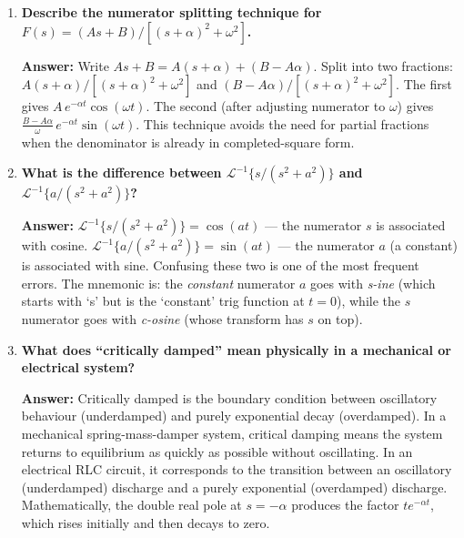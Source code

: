\documentclass[12pt,a4paper]{article}
\begin{document}
\begin{enumerate}[leftmargin=*, label=\textbf{Q\arabic*.}]
\textbf{Answer:}
\begin{itemize}[leftmargin=*]
  \item \textbf{Underdamped} ($\omega^2 = c - b^2/4 > 0$): denominator becomes
        $(s+\alpha)^2 + \omega^2$; inverse involves $e^{-\alpha t}\sin(\omega t)$ or
        $e^{-\alpha t}\cos(\omega t)$ --- oscillatory decaying response.
  \item \textbf{Critically damped} ($\omega^2 = 0$): denominator becomes $(s+\alpha)^2$;
        inverse involves $t\,e^{-\alpha t}$ --- monotone decay with initial linear rise.
  \item \textbf{Overdamped} ($\omega^2 < 0$): denominator factors into two distinct real
        linear factors; handled via partial fractions (Topic~03) --- monotone decaying
        response with no oscillation.
\end{itemize}

\item \textbf{Describe the numerator splitting technique for
      $F(s) = (As+B)/[(s+\alpha)^2 + \omega^2]$.}

\textbf{Answer:}
Write $As + B = A(s + \alpha) + (B - A\alpha)$.
Split into two fractions:
$A(s+\alpha)/[(s+\alpha)^2+\omega^2]$ and $(B-A\alpha)/[(s+\alpha)^2+\omega^2]$.
The first gives $A\,e^{-\alpha t}\cos(\omega t)$.
The second (after adjusting numerator to $\omega$) gives
$\frac{B-A\alpha}{\omega}\,e^{-\alpha t}\sin(\omega t)$.
This technique avoids the need for partial fractions when the denominator is already
in completed-square form.

\item \textbf{What is the difference between $\mathcal{L}^{-1}\{s/(s^2+a^2)\}$
      and $\mathcal{L}^{-1}\{a/(s^2+a^2)\}$?}

\textbf{Answer:}
$\mathcal{L}^{-1}\{s/(s^2+a^2)\} = \cos(at)$ --- the numerator $s$ is associated with cosine.
$\mathcal{L}^{-1}\{a/(s^2+a^2)\} = \sin(at)$ --- the numerator $a$ (a constant) is associated
with sine.
Confusing these two is one of the most frequent errors. The mnemonic is: the \emph{constant}
numerator $a$ goes with \emph{s-ine} (which starts with `s' but is the `constant' trig
function at $t=0$), while the $s$ numerator goes with \emph{c-osine} (whose transform
has $s$ on top).

\item \textbf{What does ``critically damped'' mean physically in a mechanical or
      electrical system?}

\textbf{Answer:}
Critically damped is the boundary condition between oscillatory behaviour (underdamped) and
purely exponential decay (overdamped). In a mechanical spring-mass-damper system, critical
damping means the system returns to equilibrium as quickly as possible without oscillating.
In an electrical RLC circuit, it corresponds to the transition between an oscillatory
(underdamped) discharge and a purely exponential (overdamped) discharge.
Mathematically, the double real pole at $s = -\alpha$ produces the factor $te^{-\alpha t}$,
which rises initially and then decays to zero.

\end{enumerate}
\end{document}

